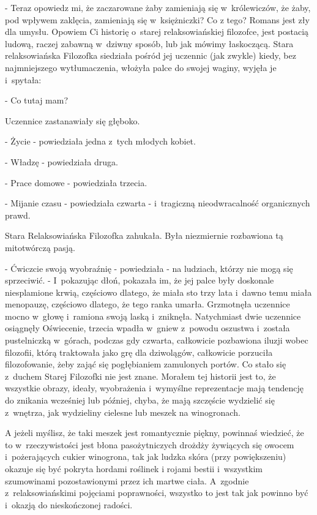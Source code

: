 \documentclass[oneside,polish,12pt,sfheadings]{mwbk}
\begin{document}
- Teraz opowiedz mi, że zaczarowane żaby zamieniają się w~królewiczów,
że żaby, pod wpływem zaklęcia, zamieniają się w~księżniczki? Co z
tego? Romans jest zły dla umysłu. Opowiem Ci historię o~starej relaksowiańskiej
filozofce, jest postacią ludową, raczej zabawną w~dziwny sposób, lub
jak mówimy łaskoczącą. Stara relaksowiańska Filozofka siedziała pośród
jej uczennic (jak zwykle) kiedy, bez najmniejszego wytłumaczenia,
włożyła palce do swojej waginy, wyjęła je i~spytała: 

- Co tutaj mam?

Uczennice zastanawiały się głęboko.

- Życie - powiedziała jedna z~tych młodych kobiet.

- Władzę - powiedziała druga.

- Prace domowe - powiedziała trzecia.

- Mijanie czasu - powiedziała czwarta - i~tragiczną nieodwracalność
organicznych prawd.

Stara Relaksowiańska Filozofka zahukała. Była niezmiernie rozbawiona
tą mitotwórczą pasją. 

- Ćwiczcie swoją wyobraźnię - powiedziała -
na ludziach, którzy nie mogą się sprzeciwić. - I~pokazując dłoń, pokazała
im, że jej palce były doskonale niesplamione krwią, częściowo dlatego,
że miała sto trzy lata i~dawno temu miała menopauzę, częściowo dlatego,
że tego ranka umarła. Grzmotnęła uczennice mocno w~głowę i~ramiona
swoją laską i~zniknęła. Natychmiast dwie uczennice osiągnęły Oświecenie,
trzecia wpadła w~gniew z~powodu oszustwa i~została pustelniczką w~górach, podczas gdy czwarta, całkowicie pozbawiona iluzji wobec filozofii,
którą traktowała jako grę dla dziwolągów, całkowicie porzuciła filozofowanie,
żeby zająć się pogłębianiem zamulonych portów. Co stało się z~duchem
Starej Filozofki nie jest znane. Morałem tej historii jest to, że
wszystkie obrazy, ideały, wyobrażenia i~wymyślne reprezentacje mają
tendencję do znikania wcześniej lub później, chyba, że mają szczęście
wydzielić się z~wnętrza, jak wydzieliny cielesne lub meszek na winogronach.

A jeżeli myślisz, że taki meszek jest romantycznie piękny, powinnaś
wiedzieć, że to w~rzeczywistości jest błona pasożytniczych drożdży
żywiących się owocem i~pożerających cukier winogrona, tak jak ludzka
skóra (przy powiększeniu) okazuje się być pokryta hordami roślinek
i rojami bestii i~wszystkim szumowinami pozostawionymi przez ich martwe
ciała. A~zgodnie z~relaksowiańskimi pojęciami poprawności, wszystko
to jest tak jak powinno być i~okazją do nieskończonej radości.
\end{document}
